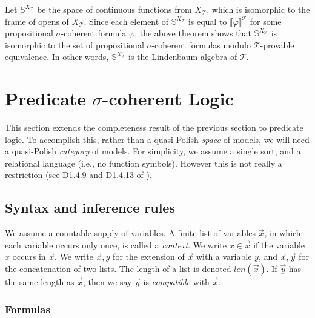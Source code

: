 \documentclass{article}
\theoremstyle{plain}
\def\cal#1{{\mathcal #1}}
\def\sierp{{\mathbb S}}
\def\calT{{\cal T}}
\begin{document}
Let $\sierp^{X_\calT}$ be the space of continuous functions from $X_\calT$, which is isomorphic to the frame of opens of $X_\calT$. Since each element of $\sierp^{X_\calT}$ is equal to $\llbracket\varphi\rrbracket^\calT$ for some propositional $\sigma$-coherent formula $\varphi$, the above theorem shows that $\sierp^{X_\calT}$ is isomorphic to the set of propositional $\sigma$-coherent formulas modulo $\calT$-provable equivalence. In other words, $\sierp^{X_\calT}$ is the Lindenbaum algebra of $\calT$.


\section{Predicate $\sigma$-coherent Logic}

This section extends the completeness result of the previous section to predicate logic. To accomplish this, rather than a quasi-Polish \emph{space} of models, we will need a quasi-Polish \emph{category} of models. For simplicity, we assume a single sort, and a relational language (i.e., no function symbols). However this is not really a restriction (see D1.4.9 and D1.4.13 of \cite{J02}).


\subsection{Syntax and inference rules}

We assume a countable supply of variables. A finite list of variables $\vec{x}$, in which each variable occurs only once, is called a \emph{context}. We write $x\in\vec{x}$ if the variable $x$ occurs in $\vec{x}$.  We write $\vec{x},y$ for the extension of $\vec{x}$ with a variable $y$, and $\vec{x},\vec{y}$ for the concatenation of two lists. The length of a list is denoted $len(\vec{x})$. If $\vec{y}$ has the same length as $\vec{x}$, then we say $\vec{y}$ is \emph{compatible} with $\vec{x}$.

\subsubsection{Formulas}
\end{document}
